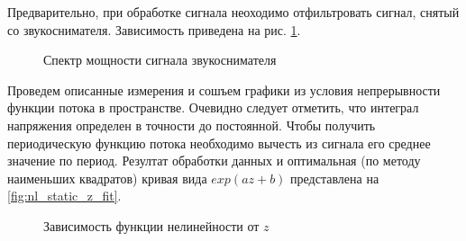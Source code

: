 \documentclass{article}
\begin{document}
Предварительно, при обработке сигнала неоходимо отфильтровать сигнал, снятый со звукоснимателя. Зависимость приведена на
рис. \ref{fig:spectrum}.

\begin{figure}
    \centering
    
    \caption{Спектр мощности сигнала звукоснимателя}
    \label{fig:spectrum}
\end{figure}

\pagebreak

Проведем описанные измерения и сошъем графики из условия непрерывности функции потока в пространстве.
Очевидно следует отметить, что интеграл напряжения определен в точности до постоянной. Чтобы получить периодическую функцию потока
необходимо вычесть из сигнала его среднее значение по период.
Резултат обработки данных и оптимальная (по методу наименьших квадратов)
кривая вида $exp(a z + b)$ представлена на \ref{fig:nl_static_z_fit}.

\begin{figure}
    \centering
    
    \caption{Зависимость функции нелинейности от $z$}
    \label{fig:nl_static_z}
\end{figure}

\printbibliography
\end{document}
